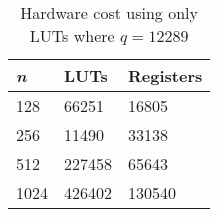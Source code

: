 \begin{table}[H]
    \centering
    \begin{tabular}{l|ll}
        \textit{n} & LUTs   & Registers \\ \hline
        128        & 66251  & 16805     \\
        256        & 11490  & 33138     \\
        512        & 227458 & 65643     \\
        1024       & 426402 & 130540
    \end{tabular}
    \caption{Hardware cost using only LUTs where $q = 12289$
    \citep{FPGA_Post_Quantum_Primitives}}
    \label{tab:hardwarecost}
\end{table}

